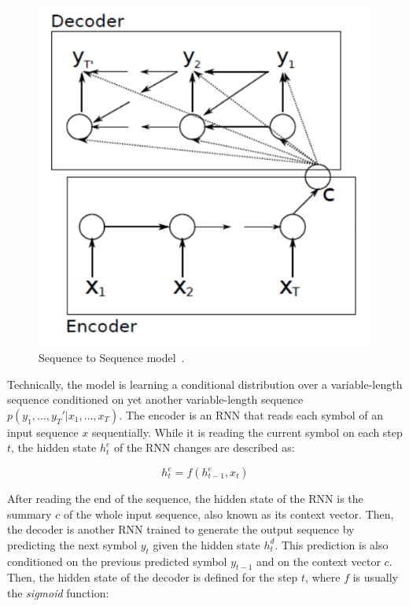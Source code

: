 \begin{figure}[!h]
    \centering
    \includegraphics[scale=.5]{imagenes/2_theorical_framework/semantic_parsing/seq2seqModel.PNG}
    \caption{Sequence to Sequence model~\cite{seqlab:Graves2012-385}.}
    \label{fig:seq2seqModel}
\end{figure}

Technically, the model is learning a conditional distribution over a variable-length sequence 
conditioned on yet another variable-length sequence $p(y_1,\ldots,y_T'|x_1,\ldots,x_T)$. The 
encoder is an RNN that reads each symbol of an input sequence $x$ sequentially. While it is 
reading the current symbol on each step $t$, the hidden state $h_{t}^e$ of the RNN changes are
described as:

\[
    h_{t}^e= f(h_{t-1}^e,x_t)
\]

After reading the end of the sequence, the hidden state of the RNN is the summary $c$ of the 
whole input sequence, also known as its context vector. Then, the decoder is another RNN 
trained to generate the output sequence by predicting the next symbol $y_t$ given the hidden 
state $h_{t}^d$. This prediction is also conditioned on the previous predicted symbol 
$y_{t-1}$ and on the context vector $c$. Then, the hidden state of the decoder is defined 
for the step $t$, where $f$ is usually the \textit{sigmoid} function:

